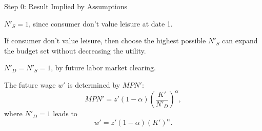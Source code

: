 \documentclass[11pt,aspectratio=169,usenames,dvipsnames]{beamer}
\let\tempone\itemize
\let\temptwo\enditemize
\renewenvironment{itemize}{\tempone\addtolength{\itemsep}{\fill}}{\temptwo}
\let\tempa\enumerate
\let\tempb\endenumerate
\renewenvironment{enumerate}{\tempa\addtolength{\itemsep}{\fill}}{\tempb}
\begin{document}
\begin{frame}{Step 0: Result Implied by Assumptions}
\label{slide:Step_0__Result_Implied_by_Assumptions}
    \begin{enumerate}
        \item $ N'_{S} = 1 $, since consumer don't value leisure at date 1.
        \begin{itemize}
            \item If consumer don't value leisure, then choose the highest possible $ N'_{S} $ can expand the budget set without decreasing the utility.
        \end{itemize}
        \item $ N'_{D} = N'_{S} = 1 $, by future labor market clearing.
        \item The future wage $ w' $ is determined by $ MPN' $:
        \begin{equation*}
            MPN' = z' ( 1-\alpha ) \left(
                \frac{K'}{N'_{D}}
            \right)^{\alpha}
        ,\end{equation*}
        where $ N'_{D} = 1 $ leads to
        \begin{equation*}
            w' = z' ( 1-\alpha ) ( K' )^{\alpha}
        .\end{equation*}
    \end{enumerate}
\end{frame}
\end{document}
